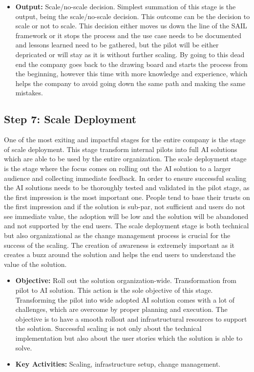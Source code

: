 \documentclass[]{imc-inf}
\begin{document}
\begin{itemize}
	alternative of simply leaving the pilot as it is and not scaling it is
	often overlooked, however it is a valid decision as sometimes the best
	one.
	\item
	\textbf{Output:} Scale/no-scale decision. Simplest summation of this
	stage is the output, being the scale/no-scale decision. This outcome
	can be the decision to scale or not to scale. This decision either
	moves us down the line of the SAIL framework or it stops the process
	and the use case needs to be documented and lessons learned need to be
	gathered, but the pilot will be either depricated or will stay as it
	is without further scaling. By going to this dead end the company goes
	back to the drawing board and starts the process from the beginning,
	however this time with more knowledge and experience, which helps the
	company to avoid going down the same path and making the same
	mistakes.
\end{itemize}

\subsection{Step 7: Scale
	Deployment}\label{step-7-scale-deployment}

One of the most exiting and impactful stages for the entire company is
the stage of scale deployment. This stage transform internal pilots into
full AI solutions which are able to be used by the entire organization.
The scale deployment stage is the stage where the focus comes on rolling
out the AI solution to a larger audience and collecting immediate
feedback. In order to ensure successful scaling the AI solutions needs
to be thoroughly tested and validated in the pilot stage, as the first
impression is the most important one. People tend to base their trusts
on the first impression and if the solution is sub-par, not sufficient
and users do not see immediate value, the adoption will be low and the
solution will be abandoned and not supported by the end users. The scale
deployment stage is both technical but also organizational as the change
management process is crucial for the success of the scaling. The
creation of awareness is extremely important as it creates a buzz around
the solution and helps the end users to understand the value of the
solution.

\begin{itemize}
	\item
	\textbf{Objective:} Roll out the solution organization-wide.
	Transformation from pilot to AI solution. This action is the sole
	objective of this stage. Transforming the pilot into wide adopted AI
	solution comes with a lot of challenges, which are overcome by proper
	planning and execution. The objective is to have a smooth rollout and
	infrastructural resources to support the solution. Successful scaling
	is not only about the technical implementation but also about the user
	stories which the solution is able to solve.
	\item
	\textbf{Key Activities:} Scaling, infrastructure setup, change
	management.
\end{itemize}
\end{document}
